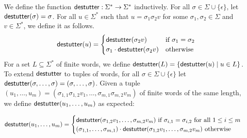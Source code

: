 We define the function $\mathsf{destutter} : \Sigma^* \to \Sigma^*$ inductively.
For all $\sigma \in \Sigma \cup \{\epsilon\}$, let $\mathsf{destutter}(\sigma) = \sigma$.
For all $u \in \Sigma^*$ such that $u = \sigma_1 \sigma_2 v$ for some $\sigma_1,\sigma_2 \in 
\Sigma$ and $v \in \Sigma^*$, we define it as follows.
%
\small
\begin{equation*}
	\mathsf{destutter}(u) =
	\begin{cases}
		\mathsf{destutter}(\sigma_2 v) & \text{if } \sigma_1 = \sigma_2 \\
		\sigma_1 \cdot \mathsf{destutter}(\sigma_2 v) & \text{otherwise}
	\end{cases}
\end{equation*}
\normalsize
For a set $L \subseteq \Sigma^*$ of finite words, we define $\destutter(L) = 
\{\destutter(u) \st u \in L\}$.
%
To extend $\mathsf{destutter}$ to tuples of words, for all $\sigma \in \Sigma \cup \{\epsilon\}$  let $\mathsf{destutter}(\sigma, \ldots, \sigma) = (\sigma, \ldots, \sigma)$.
Given a tuple $(u_1, \ldots, u_m) = (\sigma_{1,1} \sigma_{1,2} v_1, \ldots, \sigma_{m,1} \sigma_{m,2} v_m)$ of finite words of the same length, we define $\mathsf{destutter}(u_1, \ldots, u_m)$ as expected:

\small
\begin{equation*}
	\mathsf{destutter}(u_1, \ldots, u_m) =
	\begin{cases}
		\mathsf{destutter}(\sigma_{1,2} v_1, \ldots, \sigma_{m,2} v_m) \text{ if $\sigma_{i,1} = \sigma_{i,2}$ for all $1 \leq i \leq m$} \\
		(\sigma_{1,1}, \ldots, \sigma_{m,1}) \cdot \mathsf{destutter}(\sigma_{1,2} v_1, \ldots, \sigma_{m,2} v_m) \text{ otherwise}
	\end{cases}
\end{equation*}
\normalsize

